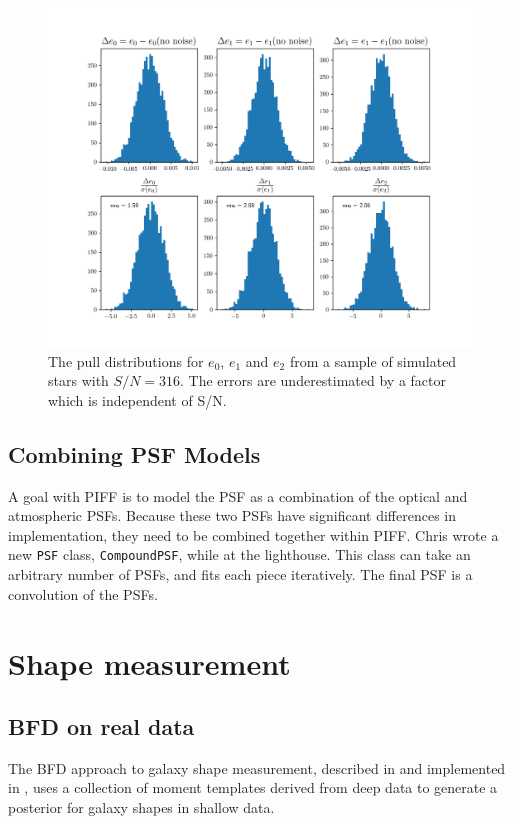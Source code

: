\documentclass[\docopts]{\docclass}
\begin{document}
\begin{figure}[h]
\includegraphics[width=0.9\columnwidth]{figures/moment-errors-flux1e5.png}
\caption{The pull distributions for $e_0$, $e_1$ and $e_2$ from a sample of simulated stars with $S/N = 316$. The errors are underestimated by a factor which is independent of S/N. \label{fig:momerror}}
\end{figure}

\subsection{Combining PSF Models}

A goal with PIFF is to model the PSF as a combination of the optical and atmospheric PSFs.
Because these two PSFs have significant differences in implementation, they need to be combined together within PIFF.
Chris wrote a new \texttt{PSF} class, \texttt{CompoundPSF}, while at the lighthouse.
This class can take an arbitrary number of PSFs, and fits each piece iteratively.
The final PSF is a convolution of the PSFs.

\section{Shape measurement}


\subsection{BFD on real data}

The BFD approach to galaxy shape measurement, described in \citet{2014MNRAS.438.1880B} and implemented in \citet{2016MNRAS.459.4467B},  uses a collection of moment templates derived from deep data to generate a posterior for galaxy shapes in shallow data.
\end{document}
